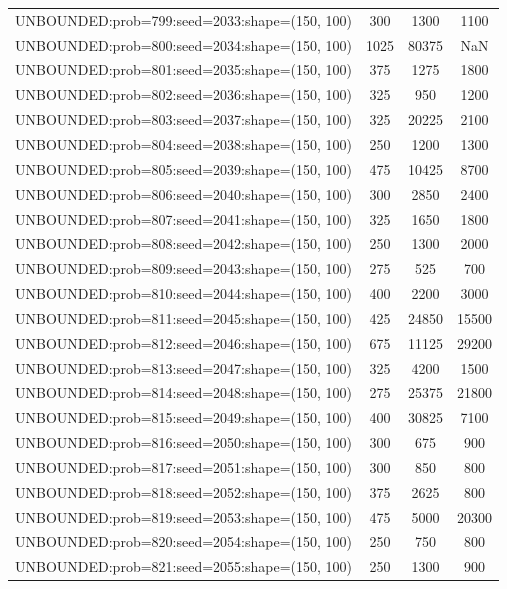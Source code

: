 \begin{longtable}{lccc}
UNBOUNDED:prob=799:seed=2033:shape=(150, 100) &      300 &  1300 &   1100 \\
UNBOUNDED:prob=800:seed=2034:shape=(150, 100) &     1025 & 80375 &    NaN \\
UNBOUNDED:prob=801:seed=2035:shape=(150, 100) &      375 &  1275 &   1800 \\
UNBOUNDED:prob=802:seed=2036:shape=(150, 100) &      325 &   950 &   1200 \\
UNBOUNDED:prob=803:seed=2037:shape=(150, 100) &      325 & 20225 &   2100 \\
UNBOUNDED:prob=804:seed=2038:shape=(150, 100) &      250 &  1200 &   1300 \\
UNBOUNDED:prob=805:seed=2039:shape=(150, 100) &      475 & 10425 &   8700 \\
UNBOUNDED:prob=806:seed=2040:shape=(150, 100) &      300 &  2850 &   2400 \\
UNBOUNDED:prob=807:seed=2041:shape=(150, 100) &      325 &  1650 &   1800 \\
UNBOUNDED:prob=808:seed=2042:shape=(150, 100) &      250 &  1300 &   2000 \\
UNBOUNDED:prob=809:seed=2043:shape=(150, 100) &      275 &   525 &    700 \\
UNBOUNDED:prob=810:seed=2044:shape=(150, 100) &      400 &  2200 &   3000 \\
UNBOUNDED:prob=811:seed=2045:shape=(150, 100) &      425 & 24850 &  15500 \\
UNBOUNDED:prob=812:seed=2046:shape=(150, 100) &      675 & 11125 &  29200 \\
UNBOUNDED:prob=813:seed=2047:shape=(150, 100) &      325 &  4200 &   1500 \\
UNBOUNDED:prob=814:seed=2048:shape=(150, 100) &      275 & 25375 &  21800 \\
UNBOUNDED:prob=815:seed=2049:shape=(150, 100) &      400 & 30825 &   7100 \\
UNBOUNDED:prob=816:seed=2050:shape=(150, 100) &      300 &   675 &    900 \\
UNBOUNDED:prob=817:seed=2051:shape=(150, 100) &      300 &   850 &    800 \\
UNBOUNDED:prob=818:seed=2052:shape=(150, 100) &      375 &  2625 &    800 \\
UNBOUNDED:prob=819:seed=2053:shape=(150, 100) &      475 &  5000 &  20300 \\
UNBOUNDED:prob=820:seed=2054:shape=(150, 100) &      250 &   750 &    800 \\
UNBOUNDED:prob=821:seed=2055:shape=(150, 100) &      250 &  1300 &    900 \\

\end{longtable}
